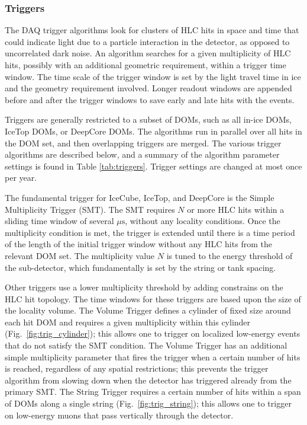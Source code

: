 \subsubsection{\label{sect:online:trigger}Triggers}

The DAQ trigger algorithms look for clusters of HLC hits in space and time
that could indicate light due to a particle interaction in the detector, as
opposed to uncorrelated dark noise.   An algorithm searches for a given
multiplicity of HLC hits, possibly with an additional geometric
requirement, within a trigger time window.  The time scale of the trigger window is
set by the light travel time in ice and the geometry requirement
involved. Longer readout windows are appended before and after the trigger
windows to save early and late hits with the events.

Triggers are generally restricted to a subset of DOMs, such as all in-ice DOMs,
IceTop DOMs, or DeepCore DOMs.  The algorithms run in parallel over all
hits in the DOM set, and then overlapping triggers are merged.  The various
trigger algorithms are described below, and a summary of the algorithm
parameter settings is found in Table \ref{tab:triggers}.  Trigger settings
are changed at most once per year.

The fundamental trigger for IceCube, IceTop, and DeepCore is the Simple
Multiplicity Trigger (SMT).  The SMT requires $N$ or more HLC hits within a
sliding time window of several $\mu\mathrm{s}$, without any locality
conditions.  Once the multiplicity condition is met, the trigger is 
extended until there is a time period of the length of the initial trigger
window without any HLC hits from the relevant DOM set.  The
multiplicity value $N$ is tuned to the energy threshold of the sub-detector,
which fundamentally is set by the string or tank spacing.

Other triggers use a lower multiplicity threshold by adding constrains on
the HLC hit topology.  The time windows for these triggers are based upon
the size of the locality volume. The Volume Trigger defines a cylinder of fixed size around
each hit DOM and requires a given multiplicity within this cylinder
(Fig.~\ref{fig:trig_cylinder}); this allows one to trigger on localized
low-energy events that do not satisfy the SMT condition.  The Volume Trigger
has an additional simple multiplicity parameter that fires the trigger when
a certain number of hits is reached, regardless of any spatial
restrictions; this prevents the trigger 
algorithm from slowing down when the detector has triggered already from
the primary SMT. The String Trigger requires a certain number of hits
within a span of DOMs along a single string 
(Fig.~\ref{fig:trig_string}); this allows one to trigger on low-energy
muons that pass vertically through the detector.

